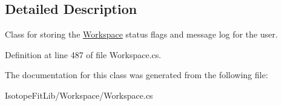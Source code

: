 \subsection{Detailed Description}
Class for storing the \hyperlink{class_isotope_fit_1_1_workspace}{Workspace} status flags and message log for the user. 



Definition at line 487 of file Workspace.\+cs.



The documentation for this class was generated from the following file\+:\begin{DoxyCompactItemize}
\item 
Isotope\+Fit\+Lib/\+Workspace/Workspace.\+cs\end{DoxyCompactItemize}

